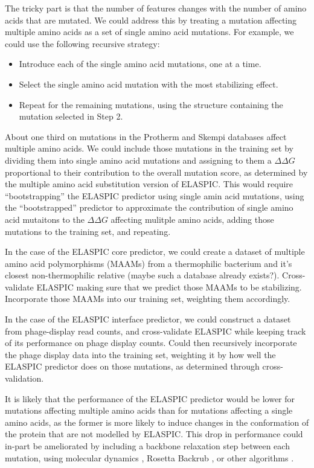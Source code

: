 The tricky part is that the number of features changes with the number of amino acids that are mutated. We could address this by treating a mutation affecting multiple amino acids as a set of single amino acid mutations. For example, we could use the following recursive strategy:

\begin{itemize}
	\itemsep0em
    \item Introduce each of the single amino acid mutations, one at a time.
    \item Select the single amino acid mutation with the most stabilizing effect.
    \item Repeat for the remaining mutations, using the structure containing the mutation selected in Step 2.
\end{itemize}

About one third on mutations in the Protherm and Skempi databases affect multiple amino acids. We could include those mutations in the training set by dividing them into single amino acid mutations and assigning to them a $\Delta \Delta G$ proportional to their contribution to the overall mutation score, as determined by the multiple amino acid substitution version of ELASPIC. This would require ``bootstrapping'' the ELASPIC predictor using single amin acid mutations, using the ``bootstrapped'' predictor to approximate the contribution of single amino acid mutaitons to the $\Delta \Delta G$ affecting mulitple amino acids, adding those mutations to the training set, and repeating.

In the case of the ELASPIC core predictor, we could create a dataset of multiple amino acid polymorphisms (MAAMs) from a thermophilic bacterium and it's closest non-thermophilic relative (maybe such a database already exists?). Cross-validate ELASPIC making sure that we predict those MAAMs to be stabilizing. Incorporate those MAAMs into our training set, weighting them accordingly.

In the case of the ELASPIC interface predictor, we could construct a dataset from phage-display read counts, and cross-validate ELASPIC while keeping track of its performance on phage display counts. Could then recursively incorporate the phage display data into the training set, weighting it by how well the ELASPIC predictor does on those mutations, as determined through cross-validation.

It is likely that the performance of the ELASPIC predictor would be lower for mutations affecting multiple amino acids than for mutations affecting a single amino acids, as the former is more likely to induce changes in the conformation of the protein that are not modelled by ELASPIC. This drop in performance could in-part be ameliorated by including a backbone relaxation step between each mutation, using molecular dynamics \cite{abraham_gromacs:_2015}, Rosetta Backrub \cite{smith_predicting_2011}, or other algorithms \cite{sun_protein_2016}.

